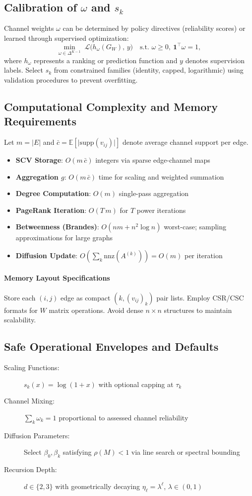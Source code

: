 \documentclass[12pt]{article}
\theoremstyle{plain}
\begin{document}
\subsection{Calibration of $\omega$ and $s_k$}
Channel weights $\omega$ can be determined by policy directives (reliability scores) or learned through supervised optimization:
\[
\min_{\omega\in\Delta^{K-1}}\; \mathcal{L}\big(h_\omega(G_W),\,y\big)\quad
\text{s.t. } \omega\ge 0,\ \mathbf{1}^\top\omega=1,
\]
where $h_\omega$ represents a ranking or prediction function and $y$ denotes supervision labels. Select $s_k$ from constrained families (identity, capped, logarithmic) using validation procedures to prevent overfitting.

\subsection{Computational Complexity and Memory Requirements}
Let $m=\lvert E\rvert$ and $\bar{c}=\mathbb{E}[\lvert\mathrm{supp}(v_{ij})\rvert]$ denote average channel support per edge.
\begin{itemize}
\item \textbf{SCV Storage}: $O(m\,\bar{c})$ integers via sparse edge-channel maps
\item \textbf{Aggregation $g$}: $O(m\,\bar{c})$ time for scaling and weighted summation
\item \textbf{Degree Computation}: $O(m)$ single-pass aggregation
\item \textbf{PageRank Iteration}: $O(T\,m)$ for $T$ power iterations
\item \textbf{Betweenness (Brandes)}: $O(nm + n^2\log n)$ worst-case; sampling approximations for large graphs
\item \textbf{Diffusion Update}: $O\!\left(\sum_k \mathrm{nnz}(A^{(k)})\right)=O(m)$ per iteration
\end{itemize}

\paragraph{Memory Layout Specifications}
Store each $(i,j)$ edge as compact $(k,(v_{ij})_k)$ pair lists. Employ CSR/CSC formats for $W$ matrix operations. Avoid dense $n\times n$ structures to maintain scalability.

\subsection{Safe Operational Envelopes and Defaults}
\begin{description}
\item[Scaling Functions:] $s_k(x)=\log(1+x)$ with optional capping at $\tau_k$
\item[Channel Mixing:] $\sum_k \omega_k=1$ proportional to assessed channel reliability  
\item[Diffusion Parameters:] Select $\beta_0,\beta_k$ satisfying $\rho(M)<1$ via line search or spectral bounding
\item[Recursion Depth:] $d\in\{2,3\}$ with geometrically decaying $\eta_\ell=\lambda^\ell$, $\lambda\in(0,1)$
\end{description}
\end{document}
